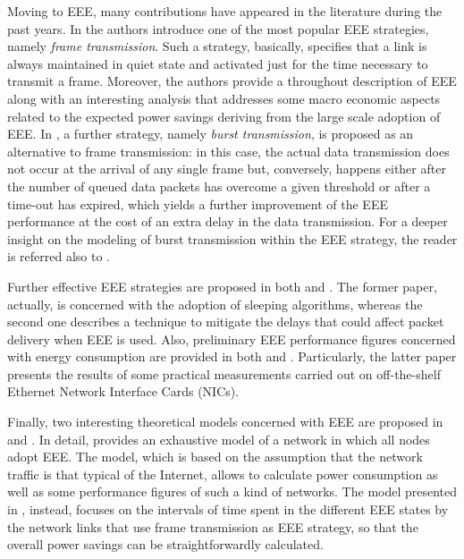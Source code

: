 \documentclass[journal,10pt,twoside,final]{IEEEtran}
\begin{document}
Moving to EEE, many contributions have appeared in the literature during the past years. In \cite{ChristensenReviriegoNordman10} the authors introduce one of the most popular EEE strategies, namely \emph{frame transmission}. Such a strategy, basically, specifies that a link is always maintained in quiet state and activated just for the time necessary to transmit a frame. Moreover, the authors provide a throughout description of EEE along with an interesting analysis that addresses some macro economic aspects related to the expected power savings deriving from the large scale adoption of EEE. In \cite{ReviriegoMaestroHernandez10}, a further strategy, namely \emph{burst transmission}, is proposed as an alternative to frame transmission: in this case, the actual data transmission does not occur at the arrival of any single frame but, conversely, happens either after the number of queued data packets has overcome a given threshold or after a time-out has expired, which yields a further improvement of the EEE 
performance at the cost of an extra delay in the data transmission. For a deeper insight on the modeling of burst transmission within the EEE strategy, the reader is referred also to \cite{MengRenJiang13}. 

Further effective EEE strategies are proposed in both \cite{HerreriaRodriguezFernandez12} and \cite{reviriego_4}. The former paper, actually, is concerned with the adoption of sleeping algorithms, whereas the second one describes a technique to mitigate the delays that could affect packet delivery when EEE is used. Also, preliminary EEE performance figures concerned with energy consumption are provided in both \cite{ReviriegoHernandezLarrabeiti09} and \cite{ReviriegoChristensenRabanillo11}. Particularly, the latter paper presents the results of some practical measurements carried out on off-the-shelf Ethernet Network Interface Cards (NICs).

Finally, two interesting theoretical models concerned with EEE are proposed in \cite{bolla_jsac} and \cite{marsan_cl}. In detail, \cite{bolla_jsac} provides an exhaustive model of a network in which all nodes adopt EEE. The model, which is based on the assumption that the network traffic is that typical of the Internet, allows to calculate power consumption as well as some performance figures of such a kind of networks. The model presented in \cite{marsan_cl}, instead, focuses on the intervals of time spent in the different EEE states by the network links that use frame transmission as EEE strategy, so that the overall power savings can be straightforwardly calculated. 
\end{document}

